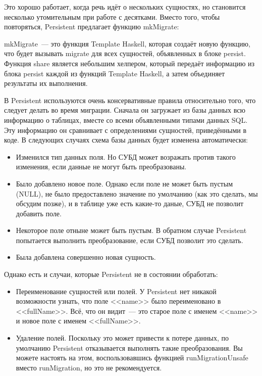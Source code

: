 Это хорошо работает, когда речь идёт о нескольких сущностях, но становится
несколько утомительным при работе с десятками. Вместо того, чтобы повторяться,
Persistent предлагает функцию mkMigrate:


mkMigrate~--- это функция Template Haskell, которая создаёт новую функцию, что
будет вызывать migrate для всех сущностей, объявленных в блоке persist. Функция
share является небольшим хелпером, который передаёт информацию из блока persist
каждой из функций Template Haskell, а затем объединяет результаты их
выполнения.

В Persistent используются очень консервативные правила относительно того, что
следует делать во время миграции. Сначала он загружает из базы данных всю
информацию о таблицах, вместе со всеми объявленными типами данных SQL. Эту
информацию он сравнивает с определениями сущностей, приведёнными в коде. В
следующих случаях схема базы данных будет изменена автоматически:

\begin{itemize}
    \item Изменился тип данных поля. Но СУБД может возражать против такого
        изменения, если данные не могут быть преобразованы.

    \item Было добавлено новое поле. Однако если поле не может быть пустым
        (NULL), не было предоставлено значение по умолчанию (как это сделать,
        мы обсудим позже), и в таблице уже есть какие-то даные, СУБД не
        позволит добавить поле.

    \item Некоторое поле отныне может быть пустым. В обратном случае Persistent
        попытается выполнить преобразование, если СУБД позволит это сделать.

    \item Была добавлена совершенно новая сущность.
\end{itemize}

Однако есть и случаи, которые Persistent не в состоянии обработать:

\begin{itemize}
    \item Переименование сущностей или полей. У Persistent нет никакой
        возможности узнать, что поле <<name>> было переименовано в
        <<fullName>>. Всё, что он видит~--- это старое поле с именем <<name>> и
        новое поле с именем <<fullName>>.

    \item Удаление полей. Поскольку это может привести к потере данных, по
        умолчанию Persistent отказывается выполнять такие преобразования. Вы
        можете настоять на этом, воспользовавшись функцией runMigrationUnsafe
        вместо runMigration, но это не рекомендуется.
\end{itemize}

